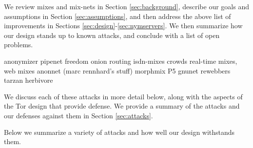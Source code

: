 \documentclass[times,10pt,twocolumn]{article}
\begin{document}
We review mixes and mix-nets in Section \ref{sec:background},
describe our goals and assumptions in Section \ref{sec:assumptions},
and then address the above list of improvements in Sections
\ref{sec:design}-\ref{sec:nymservers}. We then summarize how our design
stands up to known attacks, and conclude with a list of open problems.


\label{sec:background}

anonymizer
pipenet
freedom
onion routing
isdn-mixes
crowds
real-time mixes, web mixes
anonnet (marc rennhard's stuff)
morphmix
P5
gnunet
rewebbers
tarzan
herbivore




We discuss each of these attacks in more detail below, along with the
aspects of the Tor design that provide defense. We provide a summary
of the attacks and our defenses against them in Section \ref{sec:attacks}.

\label{sec:assumptions}


\label{sec:design}



\label{subsec:exitpolicies}

\label{subsec:dir-servers}

\label{sec:rendezvous}

\label{sec:maintaining-anonymity}

\label{subsec:many-messages}


\label{sec:attacks}

Below we summarize a variety of attacks and how well our design withstands
them.


\label{sec:conclusion}






\end{document}
